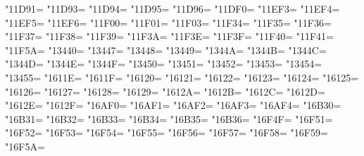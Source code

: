\XeTeXcharclass"11D91=\KclassCM
\XeTeXcharclass"11D93=\KclassCM
\XeTeXcharclass"11D94=\KclassCM
\XeTeXcharclass"11D95=\KclassCM
\XeTeXcharclass"11D96=\KclassCM
\XeTeXcharclass"11DF0=\KclassCM
\XeTeXcharclass"11EF3=\KclassCM
\XeTeXcharclass"11EF4=\KclassCM
\XeTeXcharclass"11EF5=\KclassCM
\XeTeXcharclass"11EF6=\KclassCM
\XeTeXcharclass"11F00=\KclassCM
\XeTeXcharclass"11F01=\KclassCM
\XeTeXcharclass"11F03=\KclassCM
\XeTeXcharclass"11F34=\KclassCM
\XeTeXcharclass"11F35=\KclassCM
\XeTeXcharclass"11F36=\KclassCM
\XeTeXcharclass"11F37=\KclassCM
\XeTeXcharclass"11F38=\KclassCM
\XeTeXcharclass"11F39=\KclassCM
\XeTeXcharclass"11F3A=\KclassCM
\XeTeXcharclass"11F3E=\KclassCM
\XeTeXcharclass"11F3F=\KclassCM
\XeTeXcharclass"11F40=\KclassCM
\XeTeXcharclass"11F41=\KclassCM
\XeTeXcharclass"11F5A=\KclassCM
\XeTeXcharclass"13440=\KclassCM
\XeTeXcharclass"13447=\KclassCM
\XeTeXcharclass"13448=\KclassCM
\XeTeXcharclass"13449=\KclassCM
\XeTeXcharclass"1344A=\KclassCM
\XeTeXcharclass"1344B=\KclassCM
\XeTeXcharclass"1344C=\KclassCM
\XeTeXcharclass"1344D=\KclassCM
\XeTeXcharclass"1344E=\KclassCM
\XeTeXcharclass"1344F=\KclassCM
\XeTeXcharclass"13450=\KclassCM
\XeTeXcharclass"13451=\KclassCM
\XeTeXcharclass"13452=\KclassCM
\XeTeXcharclass"13453=\KclassCM
\XeTeXcharclass"13454=\KclassCM
\XeTeXcharclass"13455=\KclassCM
\XeTeXcharclass"1611E=\KclassCM
\XeTeXcharclass"1611F=\KclassCM
\XeTeXcharclass"16120=\KclassCM
\XeTeXcharclass"16121=\KclassCM
\XeTeXcharclass"16122=\KclassCM
\XeTeXcharclass"16123=\KclassCM
\XeTeXcharclass"16124=\KclassCM
\XeTeXcharclass"16125=\KclassCM
\XeTeXcharclass"16126=\KclassCM
\XeTeXcharclass"16127=\KclassCM
\XeTeXcharclass"16128=\KclassCM
\XeTeXcharclass"16129=\KclassCM
\XeTeXcharclass"1612A=\KclassCM
\XeTeXcharclass"1612B=\KclassCM
\XeTeXcharclass"1612C=\KclassCM
\XeTeXcharclass"1612D=\KclassCM
\XeTeXcharclass"1612E=\KclassCM
\XeTeXcharclass"1612F=\KclassCM
\XeTeXcharclass"16AF0=\KclassCM
\XeTeXcharclass"16AF1=\KclassCM
\XeTeXcharclass"16AF2=\KclassCM
\XeTeXcharclass"16AF3=\KclassCM
\XeTeXcharclass"16AF4=\KclassCM
\XeTeXcharclass"16B30=\KclassCM
\XeTeXcharclass"16B31=\KclassCM
\XeTeXcharclass"16B32=\KclassCM
\XeTeXcharclass"16B33=\KclassCM
\XeTeXcharclass"16B34=\KclassCM
\XeTeXcharclass"16B35=\KclassCM
\XeTeXcharclass"16B36=\KclassCM
\XeTeXcharclass"16F4F=\KclassCM
\XeTeXcharclass"16F51=\KclassCM
\XeTeXcharclass"16F52=\KclassCM
\XeTeXcharclass"16F53=\KclassCM
\XeTeXcharclass"16F54=\KclassCM
\XeTeXcharclass"16F55=\KclassCM
\XeTeXcharclass"16F56=\KclassCM
\XeTeXcharclass"16F57=\KclassCM
\XeTeXcharclass"16F58=\KclassCM
\XeTeXcharclass"16F59=\KclassCM
\XeTeXcharclass"16F5A=\KclassCM
